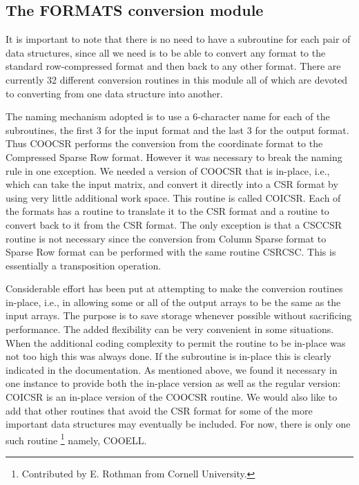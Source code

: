 \subsection{The FORMATS conversion module}
It is important to note that there is no need to have a subroutine for
each pair of data structures, since all we need is to be able to
convert any format to the standard row-compressed format and then back
to any other format.  There are currently 32 different conversion
routines in this module all of which are devoted to converting from
one data structure into another.

The naming mechanism adopted is to use a 6-character name for each of
the subroutines, the first 3 for the input format and the last 3 for
the output format.  Thus COOCSR performs the conversion from the
coordinate format to the Compressed Sparse Row format.  However it was
necessary to break the naming rule in one exception.  We needed a
version of COOCSR that is in-place, i.e., which can take the input
matrix, and convert it directly into a CSR format by using very little
additional work space.  This routine is called COICSR.  Each of
the formats has a routine to translate it to the CSR format and a routine
to convert back to it from the CSR format.  The only exception is that
a CSCCSR routine is not necessary since
the conversion from Column Sparse format to Sparse Row format  can be
performed with the same routine CSRCSC.  This is essentially a transposition
operation.

Considerable effort has been put at attempting to make the conversion
routines in-place, i.e., in allowing some or all of 
the output arrays to be the same as the input arrays. 
The purpose is to save storage whenever possible without
sacrificing performance. The added flexibility can be 
very convenient in some situations. 
When the additional coding complexity to  permit
the routine to be in-place was not too high this was always done.
If the subroutine is in-place this is clearly indicated in the
documentation. As mentioned above, we found it necessary in one instance
to provide both the in-place version as well as the regular version:
 COICSR is an in-place version of the COOCSR routine.
We would also like to add that other routines that avoid the
CSR format for some of the more important data structures may
eventually be included. For now, there is only one such routine
\footnote{Contributed by E. Rothman from Cornell University.}
namely, COOELL. 

